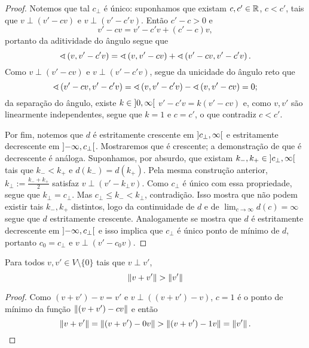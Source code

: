 \begin{proof}
Notemos que tal $c_{\perp}$ é único: suponhamos que existam $c,c' \in \mathbb{R}$, $c < c'$, tais que $v \perp (v'-cv)$ e $v \perp (v'-c'v)$. Então $c'-c > 0$ e
	\begin{equation*}
		v'-cv = v'-c'v + (c'-c)v,
	\end{equation*}
portanto da aditividade do ângulo segue que
	\begin{equation*}
		\sphericalangle\left({v},{v'-c'v}\right) = \sphericalangle\left({v},{v'-cv}\right) + \sphericalangle\left({v'-cv},{v'-c'v}\right).
	\end{equation*}
Como $v \perp (v'-cv)$ e $v \perp (v'-c'v)$, segue da unicidade do ângulo reto que
	\begin{equation*}
		\sphericalangle\left({v'-cv},{v'-c'v}\right) = \sphericalangle\left({v},{v'-c'v}\right) - \sphericalangle\left({v},{v'-cv}\right) = 0;
	\end{equation*}
da separação do ângulo, existe $k \in \left]{0},{\infty}\right[$ $v'-c'v = k(v'-cv)$ e, como $v,v'$ são linearmente independentes, segue que $k=1$ e $c=c'$, o que contradiz $c<c'$.

Por fim, notemos que $d$ é estritamente crescente em $\left]{c_{\perp}},{\infty}\right[$ e estritamente decrescente em $\left]{-\infty},{c_{\perp}}\right[$. Mostraremos que é crescente; a demonstração de que é decrescente é análoga. Suponhamos, por absurdo, que existam $k_{-},k_{+} \in \left]{c_{\perp}},{\infty}\right[$ tais que $k_{-} < k_{+}$ e $d(k_{-}) = d(k_{+})$. Pela mesma construção anterior, $k_{\perp} := \frac{k_{-} + k_{+}}{2}$ satisfaz $v \perp (v'-k_{\perp}v)$. Como $c_{\perp}$ é único com essa propriedade, segue que $k_{\perp} = c_{\perp}$.  Mas $c_{\perp} \leq k_{-} < k_{\perp}$, contradição. Isso mostra que não podem existir tais $k_{-},k_{+}$ distintos, logo da continuidade de $d$ e de $\lim_{c \to \infty} d(c) = \infty$ segue que $d$ estritamente crescente. Analogamente se mostra que $d$ é estritamente decrescente em $\left]{-\infty},{c_{\perp}}\right[$ e isso implica que $c_{\perp}$ é único ponto de mínimo de $d$, portanto $c_0 = c_{\perp}$ e $v \perp (v'-c_0v)$.
\end{proof}

\begin{corollary}
Para todos $v,v' \in V \setminus \{0\}$ tais que $v \perp v'$,
	\begin{equation*}
	\left\Vert{v+v'}\right\Vert > \left\Vert{v'}\right\Vert
	\end{equation*}
\end{corollary}
\begin{proof}
Como $(v+v')-v = v'$ e $v \perp ((v+v')-v)$, $c=1$ é o ponto de mínimo da função $\left\Vert{(v+v')-cv}\right\Vert$ e então
	\begin{equation*}
	\left\Vert{v+v'}\right\Vert = \left\Vert{(v+v')-0v}\right\Vert > \left\Vert{(v+v')-1v}\right\Vert = \left\Vert{v'}\right\Vert.
	\end{equation*}
\end{proof}


